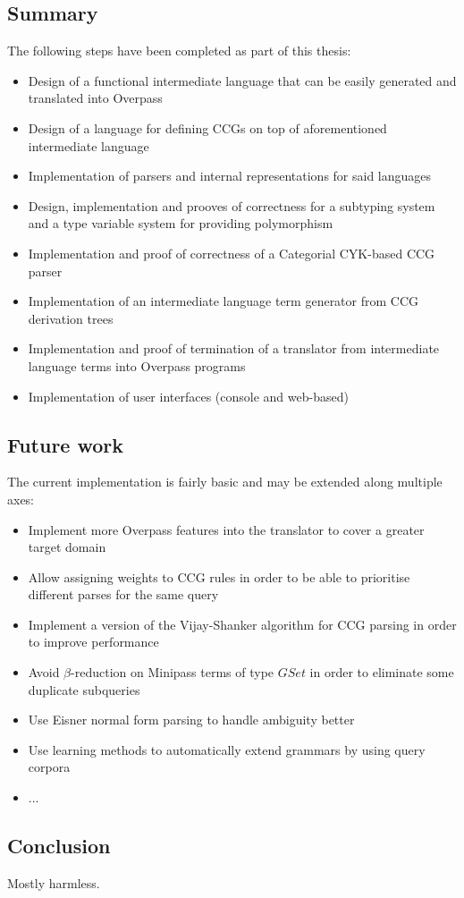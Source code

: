 \documentclass[main.tex]{subfiles}
\begin{document}
\subsection{Summary}
The following steps have been completed as part of this thesis:
\begin{itemize}
    \item Design of a functional intermediate language that can be
        easily generated and translated into Overpass
    \item Design of a language for defining CCGs on top of aforementioned
        intermediate language
    \item Implementation of parsers and internal representations for said
        languages
    \item Design, implementation and prooves of correctness for
        a subtyping system and a type variable system for providing
        polymorphism
    \item Implementation and proof of correctness of a Categorial CYK-based
        CCG parser
    \item Implementation of an intermediate language term generator from
        CCG derivation trees
    \item Implementation and proof of termination of a translator from
        intermediate language terms into Overpass programs
    \item Implementation of user interfaces (console and web-based)
\end{itemize}

\subsection{Future work}
The current implementation is fairly basic and may be extended along multiple
axes:

\begin{itemize}
    \item Implement more Overpass features into the translator to cover a greater
        target domain
    \item Allow assigning weights to CCG rules in order to be able to prioritise
        different parses for the same query
    \item Implement a version of the Vijay-Shanker algorithm for CCG parsing
        in order to improve performance
    \item Avoid $\beta$-reduction on Minipass terms of type $GSet$ in order
        to eliminate some duplicate subqueries
    \item Use Eisner normal form parsing to handle ambiguity better
    \item Use learning methods to automatically extend grammars by using
        query corpora
    \item ...
\end{itemize}

\pagebreak
\subsection{Conclusion}
Mostly harmless.
\end{document}
